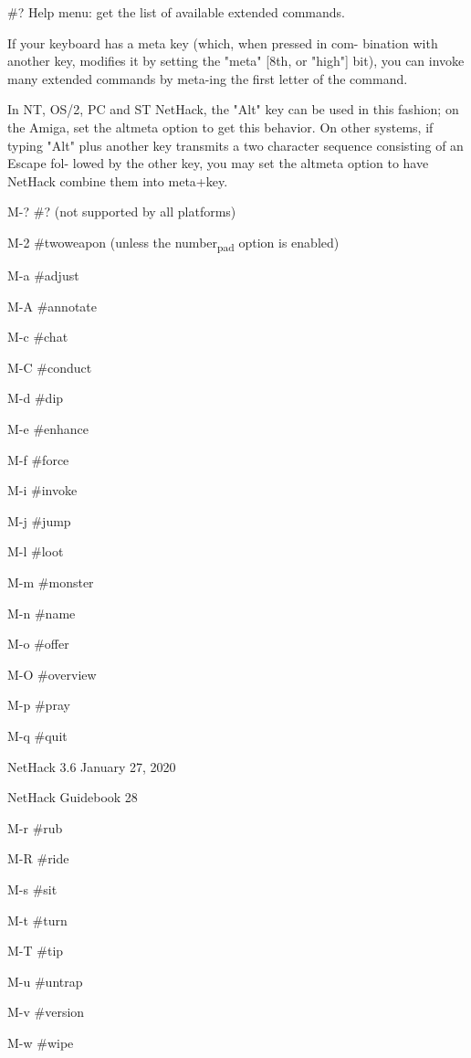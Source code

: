 \documentclass[11pt]{article}
\begin{document}
\#?
   Help menu: get the list of available extended commands.



   If your keyboard has a meta key (which, when pressed in com-
bination with another key, modifies it by setting the "meta"
[8th, or "high"] bit), you can invoke many extended commands by
meta-ing the first letter of the command.

   In NT, OS/2, PC and ST NetHack, the "Alt" key can be used in
this fashion; on the Amiga, set the altmeta option to get this
behavior.  On other systems, if typing "Alt" plus another key
transmits a two character sequence consisting of an Escape fol-
lowed by the other key, you may set the altmeta option to have
NetHack combine them into meta+key.

M-? \#? (not supported by all platforms)

M-2 \#twoweapon (unless the number\textsubscript{pad} option is enabled)

M-a \#adjust

M-A \#annotate

M-c \#chat

M-C \#conduct

M-d \#dip

M-e \#enhance

M-f \#force

M-i \#invoke

M-j \#jump

M-l \#loot

M-m \#monster

M-n \#name

M-o \#offer

M-O \#overview

M-p \#pray

M-q \#quit




NetHack 3.6                   January 27, 2020





NetHack Guidebook                       28



M-r \#rub

M-R \#ride

M-s \#sit

M-t \#turn

M-T \#tip

M-u \#untrap

M-v \#version

M-w \#wipe
\end{document}
